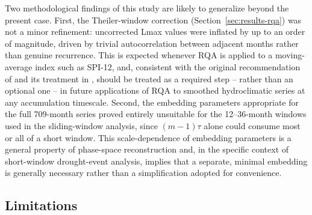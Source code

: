 \documentclass[climate,article,submit,moreauthors]{Definitions/mdpi}
\begin{document}
Two methodological findings of this study are likely to generalize beyond
the present case. First, the Theiler-window correction
(Section~\ref{sec:results-rqa}) was not a minor refinement: uncorrected Lmax
values were inflated by up to an order of magnitude, driven by trivial
autocorrelation between adjacent months rather than genuine recurrence. This
is expected whenever RQA is applied to a moving-average index such as
SPI-12, and, consistent with the original recommendation of
\cite{Theiler1986} and its treatment in \cite{Marwan2007}, should be treated
as a required step -- rather than an optional one -- in future applications
of RQA to smoothed hydroclimatic series at any accumulation timescale.
Second, the embedding parameters appropriate for the full 709-month series
proved entirely unsuitable for the 12--36-month windows used in the
sliding-window analysis, since $(m-1)\tau$ alone could consume most or all
of a short window. This scale-dependence of embedding parameters is a
general property of phase-space reconstruction and, in the specific context
of short-window drought-event analysis, implies that a separate, minimal
embedding is generally necessary rather than a simplification adopted for
convenience.

\subsection{Limitations}
\label{sec:disc-limitations}
\end{document}
